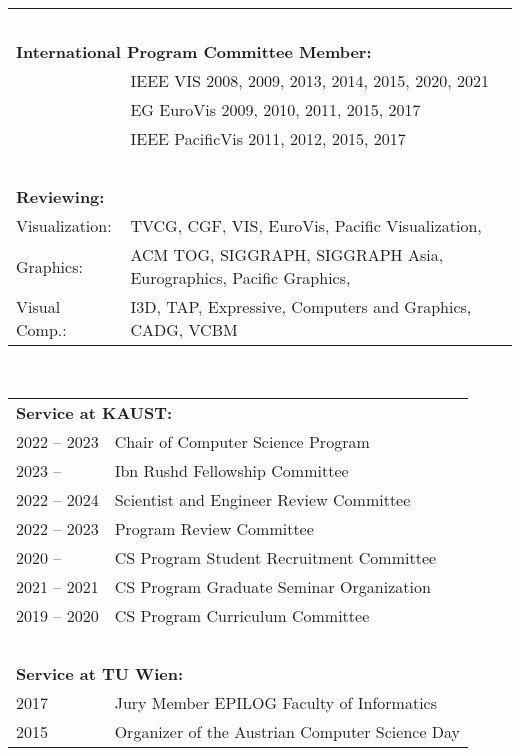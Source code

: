 \documentclass[a4paper,11pt]{letter}
\begin{document}
\begin{tabular}{l| l}
\hline
\multicolumn{2}{l}{\textbf{~}} \\
\multicolumn{2}{l}{\textbf{International Program Committee Member:}} \\
 & IEEE VIS 2008, 2009, 2013, 2014, 2015, 2020, 2021\\
 & EG EuroVis 2009, 2010, 2011, 2015, 2017\\
 & IEEE PacificVis 2011, 2012, 2015, 2017\\
\hline
\multicolumn{2}{l}{\textbf{~}} \\
\multicolumn{2}{l}{\textbf{Reviewing:}} \\
Visualization: & TVCG, CGF, VIS, EuroVis, Pacific Visualization, \\ 
Graphics: & ACM TOG, SIGGRAPH, SIGGRAPH Asia, Eurographics, Pacific Graphics, \\
Visual Comp.: & I3D, TAP, Expressive, Computers and Graphics, CADG, VCBM \\
\hline
\end{tabular}

~\\


\begin{tabular}{l| l}
\multicolumn{2}{l}{\textbf{Service at KAUST:}} \\
2022 -- 2023 & Chair of Computer Science Program\\
2023 --  & Ibn Rushd Fellowship Committee\\
2022 -- 2024 & Scientist and Engineer Review Committee\\
2022 -- 2023 & Program Review Committee\\
2020 --  & CS Program Student Recruitment Committee\\
2021 -- 2021 & CS Program Graduate Seminar Organization\\
2019 -- 2020  & CS Program Curriculum Committee\\
\hline
\multicolumn{2}{l}{\textbf{~}} \\
\multicolumn{2}{l}{\textbf{Service at TU Wien:}} \\
2017  & Jury Member EPILOG Faculty of Informatics \\
2015  & Organizer of the Austrian Computer Science Day\\
\hline
\end{tabular}
\end{document}
